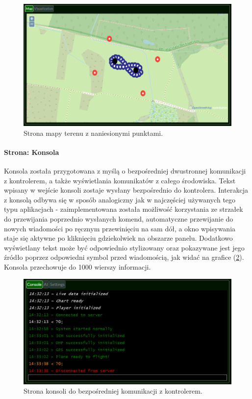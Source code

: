 \documentclass[12pt, a4paper]{article}
\let\oldref\ref
\renewcommand{\ref}[1]{(\oldref{#1})}
\begin{document}
 \begin{figure}[H]
    \centering
    \includegraphics[width=1\textwidth]{mapa}
    \caption{Strona mapy terenu z naniesionymi punktami.}
    \label{fig:mapa}
\end{figure}


\paragraph{Strona: Konsola}\mbox{}

Konsola została przygotowana z myślą o bezpośredniej dwustronnej komunikacji z kontrolerem, a także wyświetlania komunikatów z całego środowiska. Tekst wpisany w wejście konsoli zostaje wysłany bezpośrednio do kontrolera. Interakcja z konsolą odbywa się w sposób analogiczny jak w najczęściej używanych tego typu aplikacjach - zaimplementowana została możliwość korzystania ze strzałek do przewijania poprzednio wysłanych komend, automatyczne przewijanie do nowych wiadomości po ręcznym przewinięciu na sam dół, a okno wpisywania staje się aktywne po kliknięciu gdziekolwiek na obszarze panelu. Dodatkowo wyświetlany tekst może być odpowiednio stylizowany oraz pokazywane jest jego źródło poprzez odpowiedni symbol przed wiadomością, jak widać na grafice \ref{fig:konsola}. Konsola przechowuje do 1000 wierszy informacji.

 \begin{figure}[H]
    \centering
    \includegraphics[width=1\textwidth]{konsola}
    \caption{Strona konsoli do bezpośredniej komunikacji z kontrolerem.}
    \label{fig:konsola}
\end{figure}
\end{document}

